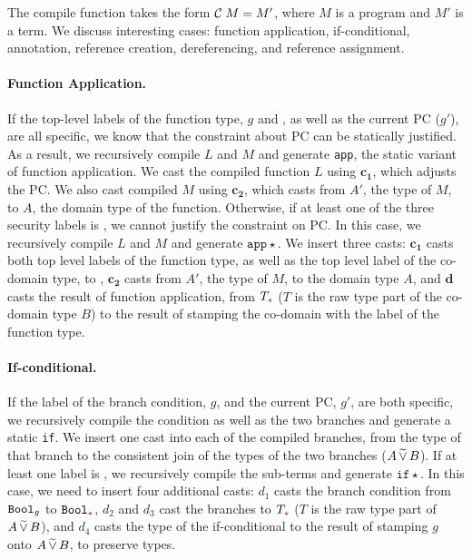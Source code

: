The compile function takes the form $\mathcal{C}\;{M} = M'$, where $M$ is a \Surface
program and $M'$ is a \CC term. We discuss interesting cases: function
application, if-conditional, annotation, reference creation, dereferencing, and
reference assignment.

\paragraph{Function Application.}
If the top-level labels of the function type, $g$ and \gc, as well as the
current PC ($g'$), are all specific, we know that the constraint about PC can be
statically justified. As a result, we recursively compile $L$ and $M$ and
generate \texttt{app}, the static variant of function application. We cast the
compiled function $L$ using $\bm{c_1}$, which adjusts the PC. We also cast
compiled $M$ using $\bm{c_2}$, which casts from $A'$, the type of $M$, to $A$,
the domain type of the function. Otherwise, if at least one of the three
security labels is \unk, we cannot justify the constraint on PC. In this case,
we recursively compile $L$ and $M$ and generate $\mathtt{app}{\star}$. We insert
three casts: $\bm{c_1}$ casts both top level labels of the function type, as
well as the top level label of the co-domain type, to \unk, $\bm{c_2}$ casts
from $A'$, the type of $M$, to the domain type $A$, and $\bm{d}$ casts the result of
function application, from $T_{\unk}$ ($T$ is the raw type part of the co-domain
type $B$) to the result of stamping the co-domain with the label of the function
type.

\paragraph{If-conditional.}
If the label of the branch condition, $g$, and the current PC, $g'$, are both
specific, we recursively compile the condition as well as the two branches and
generate a static \texttt{if}. We insert one cast into each of the compiled
branches, from the type of that branch to the consistent join of the types of
the two branches ($A \,\widetilde{\vee}\, B$). If at least one label is \unk, we
recursively compile the sub-terms and generate $\mathtt{if}{\star}$. In this
case, we need to insert four additional casts: $d_1$ casts the branch condition
from $\mathtt{Bool}_g$ to $\Bool_{\unk}$, $d_2$ and $d_3$ cast the branches to
$T_{\unk}$ ($T$ is the raw type part of $A \,\widetilde{\vee}\, B$), and $d_4$ casts the
type of the if-conditional to the result of stamping $g$ onto $A \,\widetilde{\vee}\, B$,
to preserve types.

